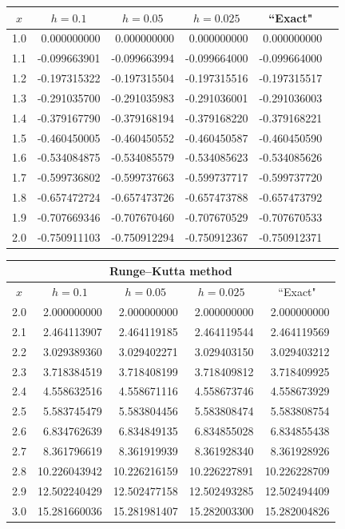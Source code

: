 \documentclass[dvips]{book}
\renewcommand{\exer}[1]{\par\medskip\;\noindent{\color{red}\bf #1.}}
\numberwithin{example}{section}
\numberwithin{equation}{section}
\numberwithin{theorem}{section}
\numberwithin{table}{section}
\numberwithin{figure}{section}
\begin{document}
\exer{3.3.12}
{\small
\begin{tabular}{|c|r|r|r|r|r|}
\hline
\multicolumn{1}{|c|}{$x$}&
\multicolumn{1}{|c|}{$h=0.1$}&
\multicolumn{1}{|c|}{$h=0.05$}&
\multicolumn{1}{|c|}{$h=0.025$}&
\multicolumn{1}{|c|}{``Exact"}\\ \hline
1.0 &  0.000000000 &  0.000000000 &  0.000000000 &  0.000000000 \\
1.1 & -0.099663901 & -0.099663994 & -0.099664000 & -0.099664000 \\
1.2 & -0.197315322 & -0.197315504 & -0.197315516 & -0.197315517 \\
1.3 & -0.291035700 & -0.291035983 & -0.291036001 & -0.291036003 \\
1.4 & -0.379167790 & -0.379168194 & -0.379168220 & -0.379168221 \\
1.5 & -0.460450005 & -0.460450552 & -0.460450587 & -0.460450590 \\
1.6 & -0.534084875 & -0.534085579 & -0.534085623 & -0.534085626 \\
1.7 & -0.599736802 & -0.599737663 & -0.599737717 & -0.599737720 \\
1.8 & -0.657472724 & -0.657473726 & -0.657473788 & -0.657473792 \\
1.9 & -0.707669346 & -0.707670460 & -0.707670529 & -0.707670533 \\
2.0 & -0.750911103 & -0.750912294 & -0.750912367 & -0.750912371 \\
\hline
\end{tabular}}


\exer{3.3.14}
{\small
\begin{tabular}{|c|r|r|r|r|}
\hline
\multicolumn{5}{|c|}{Runge--Kutta method}\\\hline
\multicolumn{1}{|c|}{$x$}&
\multicolumn{1}{|c|}{$h=0.1$}&
\multicolumn{1}{|c|}{$h=0.05$}&
\multicolumn{1}{|c|}{$h=0.025$}&
\multicolumn{1}{|c|}{``Exact"}\\ \hline
2.0 &  2.000000000 &  2.000000000 &  2.000000000 &  2.000000000 \\
2.1 &  2.464113907 &  2.464119185 &  2.464119544 &  2.464119569 \\
2.2 &  3.029389360 &  3.029402271 &  3.029403150 &  3.029403212 \\
2.3 &  3.718384519 &  3.718408199 &  3.718409812 &  3.718409925 \\
2.4 &  4.558632516 &  4.558671116 &  4.558673746 &  4.558673929 \\
2.5 &  5.583745479 &  5.583804456 &  5.583808474 &  5.583808754 \\
2.6 &  6.834762639 &  6.834849135 &  6.834855028 &  6.834855438 \\
2.7 &  8.361796619 &  8.361919939 &  8.361928340 &  8.361928926 \\
2.8 & 10.226043942 & 10.226216159 & 10.226227891 & 10.226228709 \\
2.9 & 12.502240429 & 12.502477158 & 12.502493285 & 12.502494409 \\
3.0 & 15.281660036 & 15.281981407 & 15.282003300 & 15.282004826 \\
 \hline
\end{tabular}}
\end{document}
